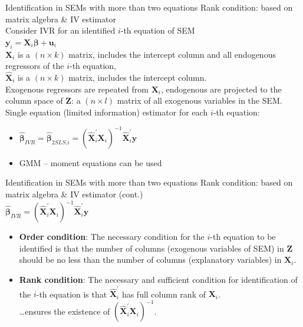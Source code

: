 \documentclass[usenames,dvipsnames]{beamer}
\begin{document}
\begin{frame}{Identification in SEMs with more than two equations}
Rank condition: based on matrix algebra \& IV estimator\\
\medskip
Consider IVR for an identified $i$-th equation of SEM\\
\medskip
$\bm{y}_i = \bm{X}_i \bm{\beta} + \bm{u}_i$\\
\medskip
$\bm{X}_i$ is a $(n\! \times \! k)$ matrix, includes the intercept column and all endogenous regressors of the $i$-th equation,\\
\medskip
$\hat{\bm{X}}_i$ is a $(n\! \times \! k)$ matrix, includes the intercept column.\\
Exogenous regressors are repeated from $\bm{X}_i$, endogenous are projected to the column space of $\bm{Z}$: a $(n\! \times \! l)$ matrix of all exogenous variables in the SEM.\\
\bigskip
Single equation (limited information) estimator for each $i$-th equation:
\begin{itemize}
\medskip
\item $\hat{\bm\beta}_{\textit{IVR}} = \hat{\bm\beta}_{2\textit{SLS,i}}=
\left(\hat{\bm{X}}^{\prime}_i \bm{X}_i \right)^{-1}\! \hat{\bm{X}}^{\prime}_i \bm{y}$\\
\medskip
\item GMM -- moment equations can be used
\end{itemize}
\end{frame}
\begin{frame}{Identification in SEMs with more than two equations}
Rank condition: based on matrix algebra \& IV estimator (cont.)\\
\medskip
$\hat{\bm\beta}_{\textit{IVR}}=
\left(\hat{\bm{X}}^{\prime}_i \bm{X}_i \right)^{-1}\! \hat{\bm{X}}^{\prime}_i \bm{y}$\\
\bigskip
\begin{itemize}
\item \textbf{Order condition}: The necessary condition for the $i$-th equation to be identified is that the number of columns (exogenous variables of SEM) in $\bm{Z}$ should be no less than the number of columns (explanatory variables) in $\bm{X}_i$.\\
\medskip
\item \textbf{Rank condition}: The necessary and sufficient condition for identification of the $i$-th equation is that $\hat{\bm{X}}^{\prime}_i$ has full column rank of $\bm{X}_i$.\\
\dots ensures the existence of $\left(\hat{\bm{X}}^{\prime}_i \bm{X}_i \right)^{-1}$.
\end{itemize}
\end{frame}
\end{document}
